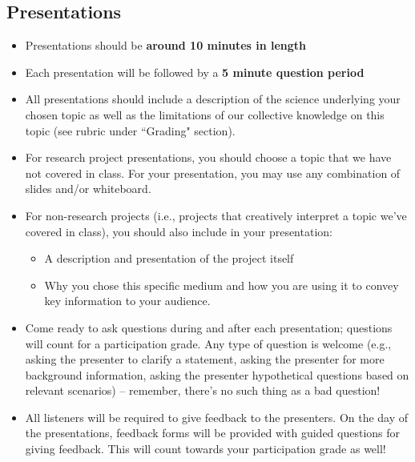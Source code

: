 \documentclass[11pt]{article}
\begin{document}
\subsection*{Presentations}
\begin{itemize}[noitemsep]
    \item Presentations should be  \textbf{around 10 minutes in length}
    \item Each presentation will be followed by a \textbf{5 minute question period}
    \item All presentations should include a description of the science underlying your chosen topic as well as the limitations of our collective knowledge on this topic (see rubric under ``Grading" section).
    \item For research project presentations, you should choose a topic that we have not covered in class. For your presentation, you may use any combination of slides and/or whiteboard.
    \item For non-research projects (i.e., projects that creatively interpret a topic we've covered in class), you should also include in your presentation:
    \begin{itemize}
        \item A description and presentation of the project itself
        \item Why you chose this specific medium and how you are using it to convey key information to your audience.
    \end{itemize}
    \item Come ready to ask questions during and after each presentation; questions will count for a participation grade.  Any type of question is welcome (e.g., asking the presenter to clarify a statement, asking the presenter for more background information, asking the presenter hypothetical questions based on relevant scenarios) -- remember, there's no such thing as a bad question!
    \item All listeners will be required to give feedback to the presenters. On the day of the presentations, feedback forms will be provided with guided questions for giving feedback. This will count towards your participation grade as well!
\end{itemize}
\end{document}
